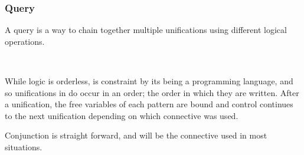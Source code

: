 \subsubsection{Query}

A query is a way to chain together multiple unifications using different
logical operations.

\begin{bnf*}
     \\
\end{bnf*}

While logic is orderless, \Law{} is constraint by its being a programming language,
and so unifications in \Law{} do occur in an order; the order in which they are
written. After a unification, the free variables of each pattern are bound and
control continues to the next unification depending on which connective was used.

\begin{prooftree}
\end{prooftree}

Conjunction is straight forward, and will be the connective used in most situations.

\begin{center}
    \parbox[t]{0.45\linewidth}{
    \begin{prooftree}
    \end{prooftree}
    }
    \quad
    \parbox[t]{0.45\linewidth}{
    \begin{prooftree}
    \end{prooftree}
}
\end{center}

